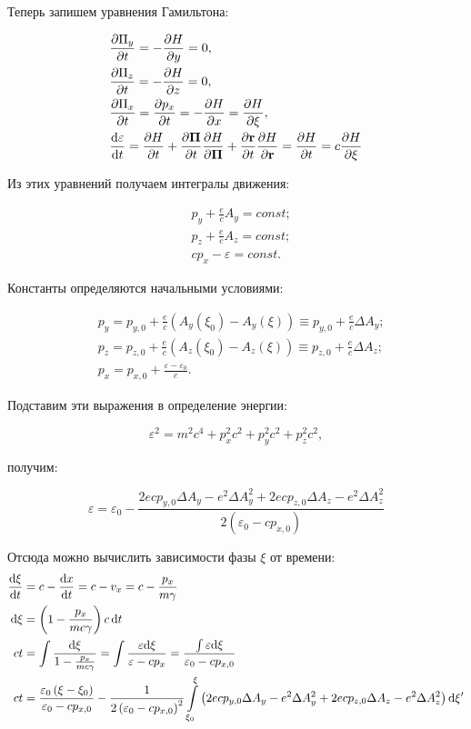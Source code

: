 \documentclass[10pt, a4paper]{article}
\begin{document}
Теперь запишем уравнения Гамильтона:

\begin{align*}
    &\pdv{\Pi_y}{t} = -\pdv{H}{y} = 0 ,\\
    &\pdv{\Pi_z}{t} = -\pdv{H}{z} = 0 ,\\
    &\pdv{\Pi_x}{t} = \pdv{p_x}{t} = -\pdv{H}{x} = \pdv{H}{\xi} ,\\
    &\dv{\varepsilon}{t} = \pdv{H}{t} + \pdv{\vb{\Pi}}{t}\pdv{H}{\vb{\Pi}}+ \pdv{\vb{r}}{t}\pdv{H}{\vb{r}} = \pdv{H}{t} = c\pdv{H}{\xi}
\end{align*}

Из этих уравнений получаем интегралы движения:

\begin{align*}
    &p_y + \frac{e}{c}A_y = const; \\
    &p_z + \frac{e}{c}A_z = const; \\
    &cp_x - \varepsilon = const.
\end{align*}

Константы определяются начальными условиями:

\begin{align*}
    &p_y = p_{y, 0} + \frac{e}{c}\left( A_y(\xi_0) - A_y(\xi) \right)\equiv p_{y, 0} + \frac{e}{c}\Delta A_y; \\
    &p_z = p_{z, 0} + \frac{e}{c}\left( A_z(\xi_0) - A_z(\xi) \right)\equiv p_{z, 0} + \frac{e}{c}\Delta A_z; \\
    &p_x = p_{x, 0} + \frac{\varepsilon-\varepsilon_0}{c}.
\end{align*}

Подставим эти выражения в определение энергии:

\begin{equation*}
    \varepsilon^2 = m^2 c^4 + p_x^2c^2 + p_y^2c^2 + p_z^2c^2,
\end{equation*}

получим:

\begin{equation*}
    \varepsilon = \varepsilon_0 - \frac{2ecp_{y,0}\Delta A_y - e^2\Delta A_y^2 + 2ecp_{z,0}\Delta A_z - e^2\Delta A_z^2}{2\left( \varepsilon_0 - cp_{x,0} \right)}
\end{equation*}

Отсюда можно вычислить зависимости фазы $\xi$ от времени:
\begin{align*}
	\dv{\xi}{t} &= c-\dv{x}{t} = c-v_x = c-\frac{p_x}{m\gamma} \\
	\dd{\xi} &= \left(1-\frac{p_x}{mc\gamma}\right) c\dd{t} \\
	ct &= \int\frac{\dd\xi}{1 - \frac{p_x}{mc\gamma}} = \int\frac{\varepsilon\dd\xi}{\varepsilon-cp_x} = \frac{\int\varepsilon\dd\xi}{\varepsilon_0-cp_{x,0}}\\
	ct &= \frac{\varepsilon_0\left( \xi-\xi_0 \right)}{ \varepsilon_0 - cp_{x,0}}-\frac{1}{2\left( \varepsilon_0 - cp_{x,0} \right)^2}\int\limits_{\xi_0}^{\xi}\left( 2ecp_{y,0}\Delta A_y - e^2\Delta A_y^2 + 2ecp_{z,0}\Delta A_z - e^2\Delta A_z^2 \right)\dd\xi'
\end{align*}
\end{document}
